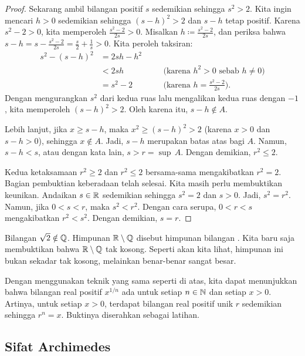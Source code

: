 \begin{example}
\begin{proof}
Sekarang ambil bilangan positif $s$ sedemikian sehingga
$s^2 > 2$.  Kita ingin mencari $h > 0$ sedemikian sehingga
${(s-h)}^2 > 2$ dan $s-h$ tetap positif.
Karena $s^2-2 > 0$, kita memperoleh $\frac{s^2-2}{2s} > 0$.
Misalkan $h \coloneqq \frac{s^2-2}{2s}$,
dan periksa bahwa $s-h=s-\frac{s^2-2}{2s} = \frac{s}{2}+\frac{1}{s} > 0$.
Kita peroleh taksiran:
\begin{equation*}
\begin{aligned}
s^2 - {(s-h)}^2 & = 2sh - h^2 \\
 & < 2sh & & \quad \bigl( \text{karena } h^2 > 0 \text{ sebab } h \neq 0 \bigr) \\
 & = s^2-2 & & \quad \bigl( \text{karena } h = \tfrac{s^2-2}{2s} \bigr) .
\end{aligned}
\end{equation*}
Dengan mengurangkan $s^2$ dari kedua ruas lalu mengalikan kedua ruas dengan $-1$, kita memperoleh
${(s-h)}^2 > 2$.  Oleh karena itu, $s-h \notin A$.

Lebih lanjut, jika $x \geq s-h$,
maka $x^2 \geq {(s-h)}^2 > 2$ (karena $x > 0$ dan $s-h > 0$), sehingga $x \notin A$.
Jadi,
$s-h$ merupakan batas atas bagi $A$.  Namun, $s-h < s$, atau dengan kata
lain, $s > r = \sup\, A$.  Dengan demikian, $r^2 \leq 2$.

\medskip

Kedua ketaksamaan $r^2 \geq 2$ dan $r^2 \leq 2$ bersama-sama mengakibatkan
$r^2 = 2$.  Bagian pembuktian keberadaan telah selesai.  Kita masih perlu
membuktikan keunikan.  Andaikan $s \in {\mathbb{R}}$ sedemikian sehingga $s^2 = 2$ dan $s > 0$.
Jadi, $s^2 = r^2$.  Namun, jika $0 < s < r$, maka $s^2 < r^2$.  Dengan cara serupa,
$0 < r < s$ mengakibatkan $r^2 < s^2$.  Dengan demikian, $s = r$.
\end{proof}
\end{example}

Bilangan $\sqrt{2} \notin {\mathbb{Q}}$.  Himpunan
${\mathbb{R}} \setminus {\mathbb{Q}}$ disebut himpunan bilangan
\emph{}.  Kita baru saja membuktikan bahwa ${\mathbb{R}} \setminus {\mathbb{Q}}$
tak kosong.  Seperti akan kita lihat, himpunan ini bukan sekadar tak kosong,
melainkan benar-benar sangat besar.

Dengan menggunakan teknik yang sama seperti di atas, kita dapat menunjukkan bahwa bilangan real positif
$x^{1/n}$ ada untuk setiap $n\in {\mathbb{N}}$ dan setiap $x > 0$.
Artinya, untuk setiap $x > 0$,
terdapat bilangan real positif unik $r$ sedemikian sehingga $r^n = x$.
Buktinya diserahkan sebagai latihan.

\subsection{Sifat Archimedes}

